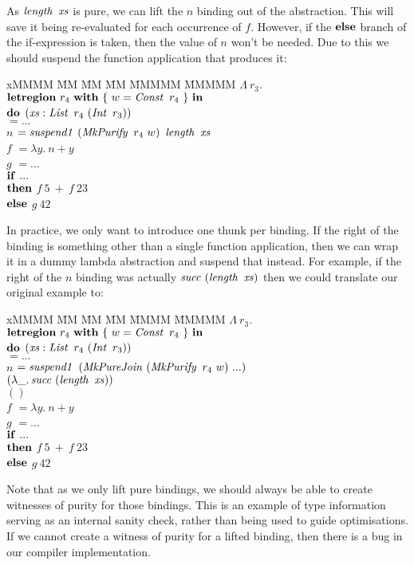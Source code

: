As $\operatorname{\mathit{length}} \ \operatorname{\mathit{xs}}$ is pure, we can lift the $n$ binding out of the abstraction. This will save it being re-evaluated for each occurrence of $f$. However, if the $\textrm{\textbf{else}}$ branch of the if-expression is taken, then the value of $n$ won't be needed. Due to this we should suspend the function application that produces it:
\begin{tabbing}
xMMMM \= MM \= MM \= MM \= MMMMM \= MMMMM\kill
	\> $\Lambda \ r_3.$ \\
	\> $\textrm{\textbf{letregion}} \ r_4 \ \textrm{\textbf{with}} \ \{ \ w = \operatorname{\mathit{Const}} \ r_4 \ \} \ \textrm{\textbf{in}}$ 
	\\[0.5ex]
	\> $\textrm{\textbf{do}}$
	   \> $(\operatorname{\mathit{xs}} : \operatorname{\mathit{List}} \ r_4 \ (\operatorname{\mathit{Int}} \ r_3))$ \\
	\> \>		\> $= ...$
	\\[1ex]
	\> \> $n$ 	\> $= \isuspendOne \ (\iMkPurify \ r_4 \ w)  \ \ilength \ \ixs$  \\
	\> \> $f$	\> $= \lambda y. \ n + y$ \\
	\> \> $g$	\> $= ...$ 
	\\[1ex]
	\> \> $\textrm{\textbf{if}} \ ...$ \\
	\> \> \quad $\textrm{\textbf{then}}$ \> \> $f \ 5 \ + \ f \ 23$ \\
	\> \> \quad $\textrm{\textbf{else}}$ \> \> $g \ 42$
\end{tabbing}

\clearpage{}
In practice, we only want to introduce one thunk per binding. If the right of the binding is something other than a single function application, then we can wrap it in a dummy lambda abstraction and suspend that instead. For example, if the right of the $n$ binding was actually $\isucc \ (\ilength \ \ixs)$ then we could translate our original example to:

\begin{tabbing}
xMMMM \= MM \= MM \= MM \= MMMM \= MMMMM \kill
	\> $\Lambda \ r_3.$ \\
	\> $\textrm{\textbf{letregion}} \ r_4 \ \textrm{\textbf{with}} \ \{ \ w = \operatorname{\mathit{Const}} \ r_4 \ \} \ \textrm{\textbf{in}}$ 
	\\[0.5ex]
	\> $\textrm{\textbf{do}}$
	   \> $(\operatorname{\mathit{xs}} : \operatorname{\mathit{List}} \ r_4 \ (\operatorname{\mathit{Int}} \ r_3))$ \\
	\> \>		\> $= ...$
	\\[1ex]
	\> \> $n$ 	\> $= \operatorname{\mathit{suspend1}}$	\> \> $(\iMkPureJoin \ (\iMkPurify \ r_4 \ w) \ ...)$  \\
	\> \>		\>			\> \> $(\lambda \_ . \isucc \ (\ilength \ \ixs))$ \\
	\> \>		\>			\> \> $()$ 
	\\[1ex]
	\> \> $f$	\> $= \lambda y. \ n + y$ \\
	\> \> $g$	\> $= ...$ 
	\\[1ex]
	\> \> $\textrm{\textbf{if}} \ ...$ \\
	\> \> \quad $\textrm{\textbf{then}}$ \> \> $f \ 5 \ + \ f \ 23$ \\
	\> \> \quad $\textrm{\textbf{else}}$ \> \> $g \ 42$
\end{tabbing}

Note that as we only lift pure bindings, we should always be able to create witnesses of purity for those bindings. This is an example of type information serving as an internal sanity check, rather than being used to guide optimisations. If we cannot create a witness of purity for a lifted binding, then there is a bug in our compiler implementation.



